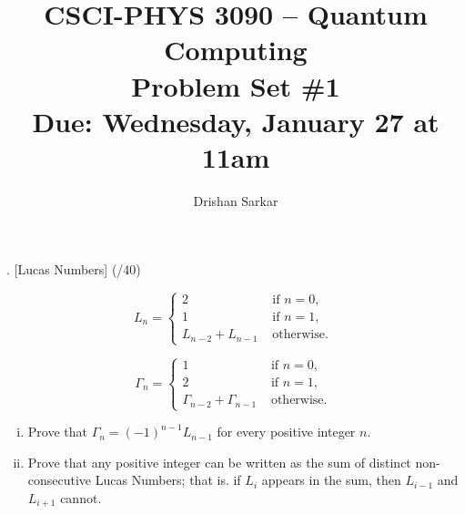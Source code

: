 \documentclass[11pt]{article}
\begin{document}
\author{Drishan Sarkar}
\title{CSCI-PHYS 3090 -- Quantum Computing\\ Problem Set \#1 \\  Due: Wednesday, January 27 at 11am}
\maketitle

 
 . [Lucas Numbers] (/40)

    \[
	L_n = 
	\begin{cases} 
	2 & \text{ if } n = 0,\\
	1 & \text{ if } n = 1,\\
	L_{n-2}+L_{n-1} & \text{ otherwise. } 
	\end{cases} 
	\]
	
	\[
	\Gamma_n = 
	\begin{cases} 
	1 & \text{ if } n = 0,\\
	2 & \text{ if } n = 1,\\
	\Gamma_{n-2}+\Gamma_{n-1} & \text{ otherwise. } 
	\end{cases} 
	\]

\begin{enumerate}[(i)]
\item Prove that $\Gamma_n = (-1)^{n-1}L_{n-1}$ for every positive integer $n$.\\

\item Prove that any positive integer can be written as the sum of distinct non-consecutive Lucas Numbers; that is. if $L_i$ appears in the sum, then $L_{i-1}$ and $L_{i+1}$ cannot.
\end{enumerate}
\end{document}
